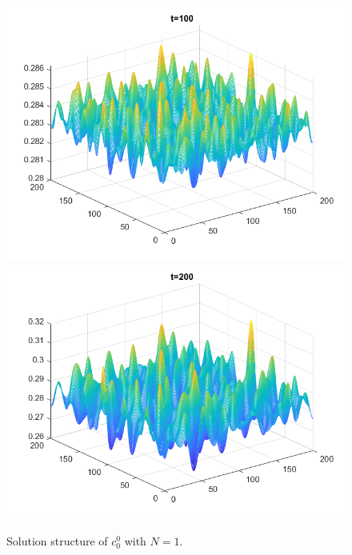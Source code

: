 \begin{frame}
	\scriptsize
	\begin{figure}[H]
		\begin{minipage}{0.4\textwidth}
			\centering
			\includegraphics[scale=0.25]{Bilder_wxwy/2nd_t=100_mx=my=200_random_Dr=1_(1.d0+(1.d-2rand(0)-5.d-4))Divide(2.d0dsqrt(pi))}
		\end{minipage}
		\hfill 
		\begin{minipage}{0.4\textwidth}
			\centering
			\includegraphics[scale=0.25]{Bilder_wxwy/2nd_t=200_mx=my=200_random_Dr=1_(1.d0+(1.d-2rand(0)-5.d-4))Divide(2.d0dsqrt(pi))}
		\end{minipage}
		
		\vspace{1ex}
		\centering
		Solution structure of \(c^0_0\) with \(N = 1\).
		

\end{figure}
\end{frame}

